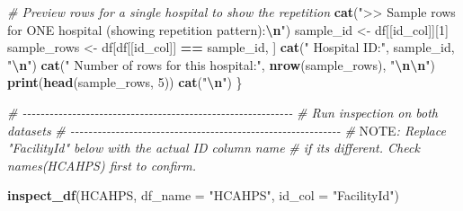\documentclass[
]{article}
\newenvironment{Shaded}{\begin{snugshade}}{\end{snugshade}}
\newcommand{\AlertTok}[1]{\textcolor[rgb]{0.94,0.16,0.16}{#1}}
\newcommand{\AttributeTok}[1]{\textcolor[rgb]{0.13,0.29,0.53}{#1}}
\newcommand{\CommentTok}[1]{\textcolor[rgb]{0.56,0.35,0.01}{\textit{#1}}}
\newcommand{\DecValTok}[1]{\textcolor[rgb]{0.00,0.00,0.81}{#1}}
\newcommand{\FunctionTok}[1]{\textcolor[rgb]{0.13,0.29,0.53}{\textbf{#1}}}
\newcommand{\NormalTok}[1]{#1}
\newcommand{\OtherTok}[1]{\textcolor[rgb]{0.56,0.35,0.01}{#1}}
\newcommand{\SpecialCharTok}[1]{\textcolor[rgb]{0.81,0.36,0.00}{\textbf{#1}}}
\newcommand{\StringTok}[1]{\textcolor[rgb]{0.31,0.60,0.02}{#1}}
\begin{document}
\begin{Shaded}
\begin{Highlighting}[]
    \CommentTok{\# Preview rows for a single hospital to show the repetition}
    \FunctionTok{cat}\NormalTok{(}\StringTok{"\textgreater{}\textgreater{} Sample rows for ONE hospital (showing repetition pattern):}\SpecialCharTok{\textbackslash{}n}\StringTok{"}\NormalTok{)}
\NormalTok{    sample\_id }\OtherTok{\textless{}{-}}\NormalTok{ df[[id\_col]][}\DecValTok{1}\NormalTok{]}
\NormalTok{    sample\_rows }\OtherTok{\textless{}{-}}\NormalTok{ df[df[[id\_col]] }\SpecialCharTok{==}\NormalTok{ sample\_id, ]}
    \FunctionTok{cat}\NormalTok{(}\StringTok{"   Hospital ID:"}\NormalTok{, sample\_id, }\StringTok{"}\SpecialCharTok{\textbackslash{}n}\StringTok{"}\NormalTok{)}
    \FunctionTok{cat}\NormalTok{(}\StringTok{"   Number of rows for this hospital:"}\NormalTok{, }\FunctionTok{nrow}\NormalTok{(sample\_rows), }\StringTok{"}\SpecialCharTok{\textbackslash{}n\textbackslash{}n}\StringTok{"}\NormalTok{)}
    \FunctionTok{print}\NormalTok{(}\FunctionTok{head}\NormalTok{(sample\_rows, }\DecValTok{5}\NormalTok{))}
    \FunctionTok{cat}\NormalTok{(}\StringTok{"}\SpecialCharTok{\textbackslash{}n}\StringTok{"}\NormalTok{)}
\NormalTok{\}}

\CommentTok{\# {-}{-}{-}{-}{-}{-}{-}{-}{-}{-}{-}{-}{-}{-}{-}{-}{-}{-}{-}{-}{-}{-}{-}{-}{-}{-}{-}{-}{-}{-}{-}{-}{-}{-}{-}{-}{-}{-}{-}{-}{-}{-}{-}{-}{-}{-}{-}{-}{-}{-}{-}{-}{-}{-}{-}{-}{-}{-}{-}{-}}
\CommentTok{\# Run inspection on both datasets}
\CommentTok{\# {-}{-}{-}{-}{-}{-}{-}{-}{-}{-}{-}{-}{-}{-}{-}{-}{-}{-}{-}{-}{-}{-}{-}{-}{-}{-}{-}{-}{-}{-}{-}{-}{-}{-}{-}{-}{-}{-}{-}{-}{-}{-}{-}{-}{-}{-}{-}{-}{-}{-}{-}{-}{-}{-}{-}{-}{-}{-}{-}{-}}
\CommentTok{\# }\AlertTok{NOTE}\CommentTok{: Replace "FacilityId" below with the actual ID column name}
\CommentTok{\# if it\textquotesingle{}s different. Check names(HCAHPS) first to confirm.}

\FunctionTok{inspect\_df}\NormalTok{(HCAHPS, }
           \AttributeTok{df\_name =} \StringTok{"HCAHPS"}\NormalTok{, }
           \AttributeTok{id\_col  =} \StringTok{"FacilityId"}\NormalTok{)}
\end{Highlighting}
\end{Shaded}
\end{document}

